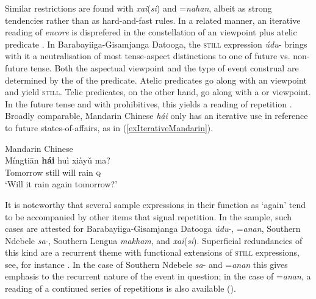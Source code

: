 Similar restrictions are found with  \mbox{\textit{xai}(\textit{si})} and  \mbox{=\textit{nahan}}, albeit as strong tendencies rather than as hard-and-fast rules. In a related manner, an iterative reading of  \textit{encore} is disprefered in the constellation of an  viewpoint plus atelic predicate \parencite[155 fn19]{MosegaardHansen2008}.  In Barabayiiga-Gisamjanga Datooga, the \textsc{still} expression \mbox{\textit{údu}-} brings with it a neutralisation of most tense-aspect distinctions to one of future vs. non-future tense. Both the aspectual viewpoint and the type of event construal are determined by the  of the predicate. Atelic predicates go along with an  viewpoint and yield \textsc{still}. Telic predicates, on the other hand, go along with a  or  viewpoint. In the future tense and with prohibitives, this yields a reading of repetition \parencite{Mitchell2021}.  Broadly comparable, Mandarin Chinese \textit{hái} only has an iterative use in reference to future states-of-affairs, as in (\ref{exIterativeMandarin}).

\begin{exe}
	\ex\label{exIterativeMandarin}Mandarin Chinese\\
	\gll  Míngtiān	\textbf{hái}	huì	xiàyǔ	ma?\\
	Tomorrow still will rain \textsc{q}\\
	\glt \lq Will it rain again tomorrow?' \parencite[61]{HuangShi2016}
\end{exe}

It is noteworthy that several sample expressions in their function as \lq again' tend to be accompanied by other items that signal repetition. In the sample, such cases are attested for Barabayiiga-Gisamjanga Datooga \mbox{\textit{údu}-},  \mbox{=\textit{anan}}, Southern Ndebele \mbox{\textit{sa}-}, Southern Lengua \textit{makham}, and  \mbox{\textit{xai}(\textit{si})}. Superficial redundancies of this kind are a recurrent theme with functional extensions of \textsc{still} expressions, see, for instance . In the case of 
Southern Ndebele \mbox{\textit{sa}-} and  \mbox{=\textit{anan}} this gives emphasis to the recurrent nature of the event in question; in the case of \mbox{=\textit{anan}}, a reading of a continued series of repetitions is also available ().

